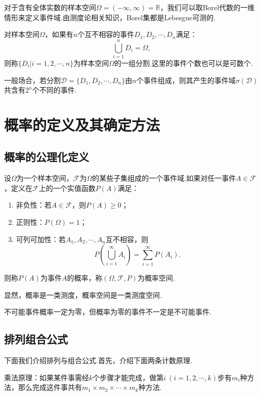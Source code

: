 对于含有全体实数的样本空间$\varOmega=(-\infty,\infty)=\mathbb{R}$，我们可以取Borel代数的一维情形来定义事件域.由测度论相关知识，Borel集都是Lebesgue可测的.

\begin{definition}[样本空间的分割]
	对样本空间$\varOmega$，如果有$n$个互不相容的事件$D_1,D_2,\cdots,D_n$满足：
	$$\bigcup_{i=1}^{n}D_i=\varOmega,$$
	则称$\{D_i|i=1,2,\cdots,n\}$为样本空间$\varOmega$的一组分割.这里的事件个数也可以是可数个.
\end{definition}
一般场合，若分割$\mathscr{D}=\{D_1,D_2,\cdots,D_n\}$由$n$个事件组成，则其产生的事件域$\sigma(\mathscr{D})$共含有$2^n$个不同的事件.

\section{概率的定义及其确定方法}
\subsection{概率的公理化定义}
\begin{definition}[概率的公理化定义]
	设$\varOmega$为一个样本空间，$\mathscr{F}$为$\varOmega$的某些子集组成的一个事件域.如果对任一事件$A\in\mathscr{F}$，定义在$\mathscr{F}$上的一个实值函数$P(A)$满足：
	\begin{enumerate}[(1)]
		\item 非负性：若$A\in\mathscr{F}$，则$P(A)\geqslant 0$；
		\item 正则性：$P(\varOmega)=1$；
		\item 可列可加性：若$A_1,A_2,\cdots,A_n$互不相容，则
		$$P\left(\bigcup_{i=1}^{\infty}A_i\right)=\sum_{i=1}^{\infty}P(A_i).$$
	\end{enumerate}
	则称$P(A)$为事件$A$的{\heiti 概率}，称$(\varOmega,\mathscr{F},P)$为{\heiti 概率空间}.
\end{definition}
\begin{remark}
	显然，概率是一类测度，概率空间是一类测度空间.
\end{remark}
\begin{remark}
	不可能事件概率一定为零，但概率为零的事件不一定是不可能事件.
\end{remark}
\subsection{排列组合公式}
下面我们介绍排列与组合公式.首先，介绍下面两条计数原理.

乘法原理：如果某件事需经$k$个步骤才能完成，做第$i\ (i=1,2,\cdots,k)$步有$m_i$种方法，那么完成这件事共有$m_1\times m_2\times\cdots\times m_k$种方法.

